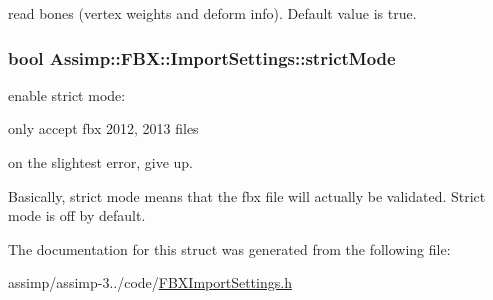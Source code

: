 read bones (vertex weights and deform info). Default value is true. \hypertarget{struct_assimp_1_1_f_b_x_1_1_import_settings_ab1f3b328a3c6ee3b6a95246d3c766121}{
\subsubsection[{strict\+Mode}]{\setlength{\rightskip}{0pt plus 5cm}bool Assimp\+::\+F\+B\+X\+::\+Import\+Settings\+::strict\+Mode}}\label{struct_assimp_1_1_f_b_x_1_1_import_settings_ab1f3b328a3c6ee3b6a95246d3c766121}
enable strict mode\+:
\begin{DoxyItemize}
\item only accept fbx 2012, 2013 files
\item on the slightest error, give up.
\end{DoxyItemize}

Basically, strict mode means that the fbx file will actually be validated. Strict mode is off by default. 

The documentation for this struct was generated from the following file\+:\begin{DoxyCompactItemize}
\item 
assimp/assimp-\/3../code/\hyperlink{_f_b_x_import_settings_8h}{F\+B\+X\+Import\+Settings.\+h}\end{DoxyCompactItemize}

